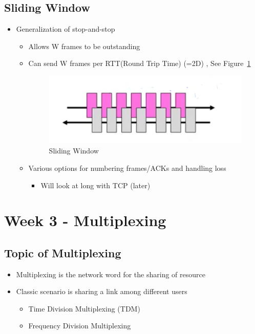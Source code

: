 \documentclass[12pt]{ctexart}   %
\begin{document}
	\subsection{Sliding Window}
	\begin{itemize}
		\item Generalization of stop-and-stop
		\begin{itemize}
			\item Allows W frames to be outstanding
			\item Can send W frames per RTT(Round Trip Time) (=2D) , See Figure~\ref{fig:3-2-9}
			
			\begin{figure}[h!] %
			\centering
			 \includegraphics[scale=0.7]{images/3-2-9}
			\caption{Sliding Window}
			 \label{fig:3-2-9}
			 \end{figure}
			 
			\item Various options for numbering frames/ACKs and handling loss
			\begin{itemize}
				\item Will look at long with TCP (later)
			\end{itemize}
		\end{itemize}
	\end{itemize}

\section{Week 3 - Multiplexing}	
	\subsection{Topic of Multiplexing}
	\begin{itemize}
		\item Multiplexing is the network word for the sharing of resource
		\item Classic scenario is sharing a link among different users
		\begin{itemize}
			\item Time Division Multiplexing (TDM)
			\item Frequency Division Multiplexing
		\end{itemize}
	\end{itemize}
	
\end{document}
